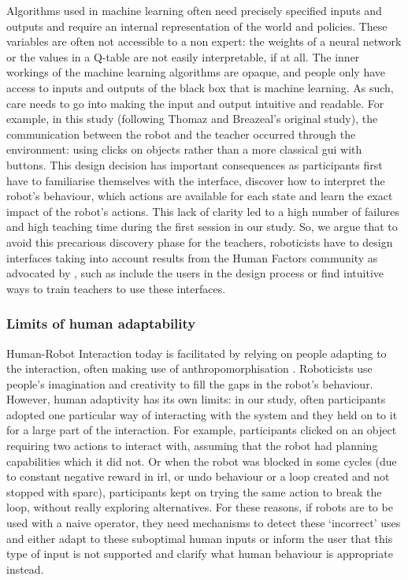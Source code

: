 Algorithms used in machine learning often need precisely specified inputs and outputs and require an internal representation of the world and policies. These variables are often not accessible to a non expert: the weights of a neural network or the values in a Q-table are not easily interpretable, if at all. The inner workings of the machine learning algorithms are opaque, and people only have access to inputs and outputs of the black box that is machine learning. As such, care needs to go into making the input and output intuitive and readable. For example, in this study (following Thomaz and Breazeal's original study), the communication between the robot and the teacher occurred through the environment: using clicks on objects rather than a more classical \gls{gui} with buttons. This design decision has important consequences as participants first have to familiarise themselves with the interface, discover how to interpret the robot's behaviour, which actions are available for each state and learn the exact impact of the robot's actions. This lack of clarity led to a high number of failures and high teaching time during the first session in our study. So, we argue that to avoid this precarious discovery phase for the teachers, roboticists have to design interfaces taking into account results from the Human Factors community as advocated by \cite{adams2002critical}, such as include the users in the design process or find intuitive ways to train teachers to use these interfaces.

\subsubsection{Limits of human adaptability}

Human-Robot Interaction today is facilitated by relying on people adapting to the interaction, often making use of anthropomorphisation \citep{zlotowski2015anthropomorphism}. Roboticists use people's imagination and creativity to fill the gaps in the robot's behaviour. However, human adaptivity has its own limits: in our study, often participants adopted one particular way of interacting with the system and they held on to it for a large part of the interaction. For example, participants clicked on an object requiring two actions to interact with, assuming that the robot had planning capabilities which it did not. Or when the robot was blocked in some cycles (due to constant negative reward in \gls{irl}, or undo behaviour or a loop created and not stopped with \gls{sparc}), participants kept on trying the same action to break the loop, without really exploring alternatives. For these reasons, if robots are to be used with a naive operator, they need mechanisms to detect these `incorrect' uses and either adapt to these suboptimal human inputs or inform the user that this type of input is not supported and clarify what human behaviour is appropriate instead.

